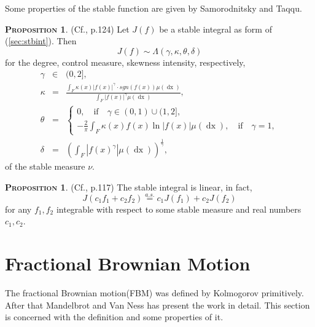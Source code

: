 \documentclass[a4paper, twoside, 11pt]{article}
\theoremstyle{definition}
\newtheorem{proposition}[definition]{\scshape Proposition}
\newcommand{\brkt}[1]{\left({#1} \right)}
\begin{document}
Some properties of the stable function are given by Samorodnitsky and Taqqu.

\begin{proposition}
  (Cf.\cite{samorodnitsky}, p.124) Let $J(f)$ be a stable integral as form of (\ref{sec:stbint}). Then 
  \begin{equation*}
	J(f) \sim \Lambda(\gamma, \kappa, \theta, \delta)
  \end{equation*}
for the degree, control measure, skewness intensity, respectively, 
\begin{eqnarray*}
\gamma &\in& (0, 2],\\
\kappa &=& \frac{\int_F \kappa(x) |f(x)|^\gamma\cdot sgn(f(x)) \mu(\mathop{dx})}{\int_F|f(x)|^\gamma\mu(\mathop{dx})},\\
\theta &=&
\begin{cases}
0 , \hspace{1em} \text{if} \hspace{1em} \gamma \in (0, 1) \cup (1, 2],\\
  -\frac{2}{\pi}\int_F \kappa(x) f(x) \ln|f(x)|\mu(\mathop{dx}), \hspace{1em} \text{if} \hspace{1em} \gamma = 1,
\end{cases}\\
\delta &=& \brkt{\int_F |f(x)^\gamma|\mu(\mathop{dx})}^{\frac{1}{\gamma}}, 
\end{eqnarray*}
of the stable measure $\nu$.
\label{sec:stbint2}
\end{proposition}
\begin{proposition}
(Cf.\cite{samorodnitsky}, p.117)  The stable integral is linear, in fact,
\begin{equation}
  J(c_1f_1 + c_2f_2) \overset{a.s.}{=}c_1J(f_1) + c_2J(f_2)
  \label{sec:stblin}
\end{equation}
for any $f_1, f_2$ integrable with respect to some stable measure and real numbers $c_1, c_2$. 
\end{proposition}
\newpage
\section{Fractional Brownian Motion}
\setcounter{equation}{0}
The fractional Brownian motion(FBM) was defined by Kolmogorov primitively. After that Mandelbrot and Van Ness has present the work in detail. This section is concerned with the definition and some properties of it.
\end{document}
